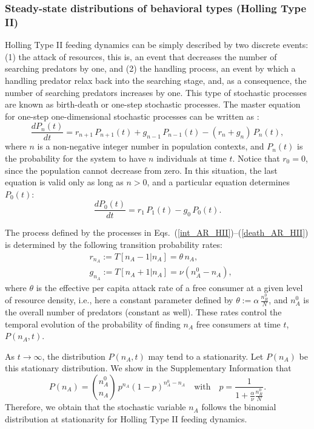 \subsubsection*{Steady-state distributions of behavioral types (Holling Type II)\smallskip}
\label{cha:box1}
\noindent Holling Type II feeding dynamics can be simply described by two discrete events: (1) the attack of resources, this is, an event that decreases the number of searching predators by one, and (2) the handling process, an event by which a handling predator relax back into the searching stage, and, as a consequence, the number of searching predators increases by one. This type of stochastic processes are known as birth-death or one-step stochastic processes. The master equation for one-step one-dimensional stochastic processes can be written as \citep{vankampen2011}:
\begin{equation*}
	\frac{d P_n(t)}{d t} = r_{n+1}\,P_{n+1}(t) + g_{n-1}\,P_{n-1}(t) -(r_n + g_n)\,P_n(t),
\end{equation*}
where $n$ is a non-negative integer number in population contexts, and $P_n(t)$ is the probability for the system to have $n$ individuals at time $t$. Notice that $r_0 = 0$, since the population cannot decrease from zero. In this situation, the last equation is valid only as long as $n>0$, and a particular equation determines $P_0(t)$:  
\begin{equation*}
\frac{dP_0(t)}{dt} = r_{1}\,P_1(t) - g_0\,P_0(t).
\end{equation*}

The process defined by the processes in Eqs.~(\ref{int_AR_HII})--(\ref{death_AR_HII}) is determined by the following transition probability rates:
\begin{align*}
&r_{n_A}:=T[n_A-1 | n_A]= \theta \,n_A,\\
&g_{n_A}:=T[n_A+1 | n_A ]= \nu (n_A^0 - n_A),
\end{align*}
where $\theta$ is the effective per capita attack rate of a free consumer at a given level of resource density, i.e., here a constant parameter defined by $\theta:=\alpha\,\frac{n_R^0}{N}$, and $n_A^0$ is the overall number of predators (constant as well). These rates control the temporal evolution of the probability of finding $n_A$ free consumers at time $t$, $P(n_A,t)$.

As $t \rightarrow \infty$, the distribution $P(n_A,t)$ may tend to a stationarity. Let $P(n_A)$ be this stationary distribution. We show in the Supplementary Information that
\begin{equation}
    P(n_A) = \binom{n_A^0}{n_A}\,p^{n_A}(1-p)^{n_A^0-n_A} \quad\text{with}\quad
    p = \frac{1}{1 + \frac{\alpha}{\nu} \frac{n_R^0}{N}}.\tag{B1}
    \label{eq:binom}
\end{equation}
Therefore, we obtain that the stochastic variable $n_A$ follows the binomial distribution at stationarity for Holling Type II feeding dynamics.

